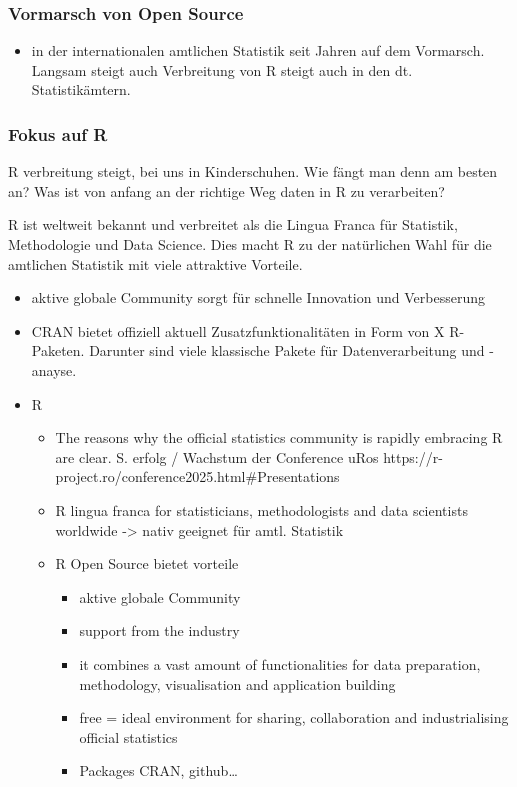 \documentclass[
  german,
  10pt,
  twoside]{article}
\providecommand{\tightlist}{%
  \setlength{\itemsep}{0pt}\setlength{\parskip}{0pt}}
\begin{document}
\subsubsection{Vormarsch von Open
Source}\label{vormarsch-von-open-source}

\begin{itemize}
\tightlist
\item
  in der internationalen amtlichen Statistik seit Jahren auf dem
  Vormarsch. Langsam steigt auch Verbreitung von R steigt auch in den
  dt. Statistikämtern.
\end{itemize}

\subsubsection{Fokus auf R}\label{fokus-auf-r}

R verbreitung steigt, bei uns in Kinderschuhen. Wie fängt man denn am
besten an? Was ist von anfang an der richtige Weg daten in R zu
verarbeiten?

R ist weltweit bekannt und verbreitet als die Lingua Franca für
Statistik, Methodologie und Data Science. Dies macht R zu der
natürlichen Wahl für die amtlichen Statistik mit viele attraktive
Vorteile.

\begin{itemize}
\item
  aktive globale Community sorgt für schnelle Innovation und
  Verbesserung
\item
  CRAN bietet offiziell aktuell Zusatzfunktionalitäten in Form von X
  R-Paketen. Darunter sind viele klassische Pakete für Datenverarbeitung
  und -anayse.
\item
  R

  \begin{itemize}
  \tightlist
  \item
    The reasons why the official statistics community is rapidly
    embracing R are clear. S. erfolg / Wachstum der Conference uRos
    https://r-project.ro/conference2025.html\#Presentations
  \item
    R lingua franca for statisticians, methodologists and data
    scientists worldwide -\textgreater{} nativ geeignet für amtl.
    Statistik
  \item
    R Open Source bietet vorteile

    \begin{itemize}
    \tightlist
    \item
      aktive globale Community
    \item
      support from the industry
    \item
      it combines a vast amount of functionalities for data preparation,
      methodology, visualisation and application building
    \item
      free = ideal environment for sharing, collaboration and
      industrialising official statistics
    \item
      Packages CRAN, github\ldots{}
    \end{itemize}
  \end{itemize}
\end{itemize}
\end{document}
